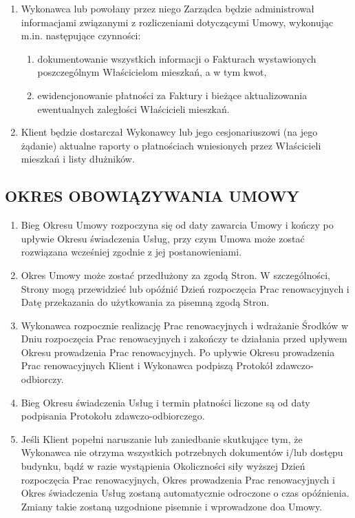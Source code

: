 \begin{multicols}{2}
\begin{enumerate}
	\item Wykonawca lub powołany przez niego Zarządca będzie administrował informacjami związanymi z rozliczeniami dotyczącymi Umowy, wykonując m.in. następujące czynności:
	\begin{enumerate}
		\item dokumentowanie wszystkich informacji o Fakturach wystawionych poszczególnym Właścicielom mieszkań, a w tym kwot,
		\item ewidencjonowanie płatności za Faktury i bieżące aktualizowania ewentualnych zaległości Właścicieli mieszkań.
	\end{enumerate}
	\item Klient będzie dostarczał Wykonawcy lub jego cesjonariuszowi (na jego żądanie) aktualne raporty o płatnościach wniesionych przez Właścicieli mieszkań i listy dłużników.
\end{enumerate}

\subsection{OKRES OBOWIĄZYWANIA UMOWY}
\begin{enumerate}
	\item Bieg Okresu Umowy rozpoczyna się od daty zawarcia Umowy i kończy po upływie Okresu świadczenia Usług, przy czym Umowa może zostać rozwiązana wcześniej zgodnie z jej postanowieniami.
	\item Okres Umowy może zostać przedłużony za zgodą Stron. W szczególności, Strony mogą przewidzieć lub opóźnić Dzień rozpoczęcia Prac renowacyjnych i Datę przekazania do użytkowania za pisemną zgodą Stron.
	\item Wykonawca rozpocznie realizację Prac renowacyjnych i wdrażanie Środków w Dniu rozpoczęcia Prac renowacyjnych i zakończy te działania przed upływem Okresu prowadzenia Prac renowacyjnych. Po upływie Okresu prowadzenia Prac renowacyjnych Klient i Wykonawca podpiszą Protokół zdawczo-odbiorczy.
	\item Bieg Okresu świadczenia Usług i termin płatności liczone są od daty podpisania Protokołu zdawczo-odbiorczego.
	\item Jeśli Klient popełni naruszanie lub zaniedbanie skutkujące tym, że Wykonawca nie otrzyma wszystkich potrzebnych dokumentów i/lub dostępu budynku, bądź w razie wystąpienia Okoliczności siły wyższej Dzień rozpoczęcia Prac renowacyjnych, Okres prowadzenia Prac renowacyjnych i Okres świadczenia Usług zostaną automatycznie odroczone o czas opóźnienia. Zmiany takie zostaną uzgodnione pisemnie i wprowadzone doa Umowy.
\end{enumerate}


\end{multicols}
